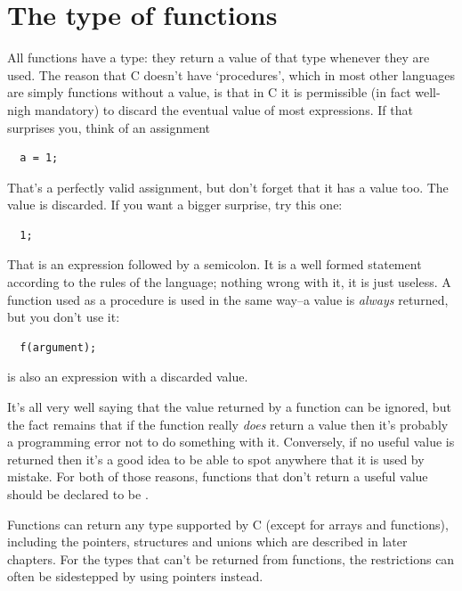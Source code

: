         \section{The type of functions}
        

  

  All functions have a type: they return a value of that type whenever
   they are used. The reason that C doesn't have `procedures', which
   in most other languages are simply functions without a value, is that in
   C it is permissible (in fact well-nigh mandatory) to discard the eventual
   value of most expressions. If that surprises you, think of an
   assignment

\begin{Verbatim}
  a = 1;
\end{Verbatim}

  That's a perfectly valid assignment, but don't forget that it has a
   value too. The value is discarded. If you want a bigger surprise, try
   this one:

\begin{Verbatim}
  1;
\end{Verbatim}

  That is an expression followed by a semicolon. It is a well formed
   statement according to the rules of the language; nothing wrong with it,
   it is just useless. A function used as a procedure is used in the same
   way--a value is \textit{always} returned, but you don't use it:

\begin{Verbatim}
  f(argument);
\end{Verbatim}

  is also an expression with a discarded value.


  It's all very well saying that the value returned by a function can be
   ignored, but the fact remains that if the function really \textit{does}
   return a value then it's probably a programming error not to do something
   with it. Conversely, if no useful value is returned then it's a good idea
   to be able to spot anywhere that it is used by mistake. For both of those
   reasons, functions that don't return a useful value should be declared to
   be \void.


  Functions can return any type supported by C (except for arrays and
   functions), including the pointers, structures and unions which are
   described in later chapters. For the types that can't be returned from
   functions, the restrictions can often be sidestepped by using pointers
   instead.


